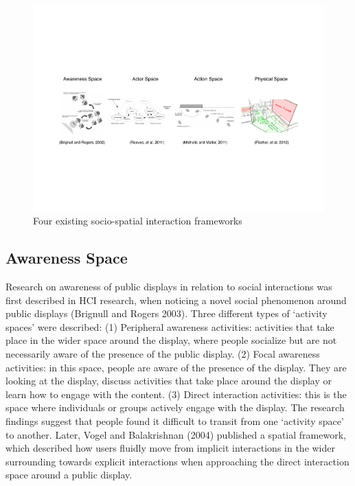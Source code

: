 \begin{figure}[htp]
\centering
\includegraphics[width=\textwidth]{Illustrations/SpatialFrameworks.pdf}
\caption{Four existing socio-spatial interaction frameworks}
\label{fig:Background-frameworks}
\end{figure}


\subsection* {Awareness Space}
Research on awareness of public displays in relation to social interactions was first described in HCI research, when noticing a novel social phenomenon around public displays (Brignull and Rogers 2003). 
Three different types of ‘activity spaces’ were described: (1) Peripheral awareness activities: activities that take place in the wider space around the display, where people socialize but are not necessarily aware of the presence of the public display. (2) Focal awareness activities: in this space, people are aware of the presence of the display. 
They are looking at the display, discuss activities that take place around the display or learn how to engage with the content. (3) Direct interaction activities: this is the space where individuals or groups actively engage with the display. The research findings suggest that
people found it difficult to transit from one ‘activity space’ to another.
Later, Vogel and Balakrishnan (2004) published a spatial framework, which
described how users fluidly move from implicit interactions in the wider surrounding
towards explicit interactions when approaching the direct interaction space
around a public display.

